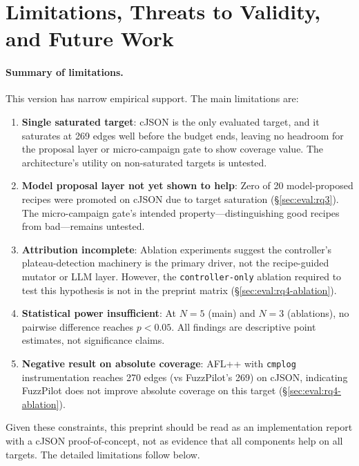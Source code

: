 \documentclass[11pt]{article}
\begin{document}
\section{Limitations, Threats to Validity, and Future Work}
\label{sec:limits}

\paragraph{Summary of limitations.}
This version has narrow empirical support. The main limitations are:

\begin{enumerate}
\item \textbf{Single saturated target}: cJSON is the only evaluated
target, and it saturates at 269 edges well before the budget ends,
leaving no headroom for the proposal layer or micro-campaign gate
to show coverage value. The architecture's utility on non-saturated
targets is untested.

\item \textbf{Model proposal layer not yet shown to help}: Zero of 20
model-proposed recipes were promoted on cJSON due to target saturation
(\S\ref{sec:eval:rq3}). The micro-campaign gate's intended
property---distinguishing good recipes from bad---remains untested.

\item \textbf{Attribution incomplete}: Ablation experiments suggest
the controller's plateau-detection machinery is the primary driver,
not the recipe-guided mutator or LLM layer. However, the
\texttt{controller-only} ablation required to test this hypothesis is
not in the preprint matrix (\S\ref{sec:eval:rq4-ablation}).

\item \textbf{Statistical power insufficient}: At $N{=}5$ (main) and
$N{=}3$ (ablations), no pairwise difference reaches $p{<}0.05$. All
findings are descriptive point estimates, not significance claims.

\item \textbf{Negative result on absolute coverage}: AFL++ with
\texttt{cmplog} instrumentation reaches 270 edges (vs FuzzPilot's
269) on cJSON, indicating FuzzPilot does not improve absolute
coverage on this target (\S\ref{sec:eval:rq4-ablation}).
\end{enumerate}

Given these constraints, this preprint should be read as an
implementation report with a cJSON proof-of-concept, not as evidence
that all components help on all targets. The detailed limitations
follow below.
\end{document}
